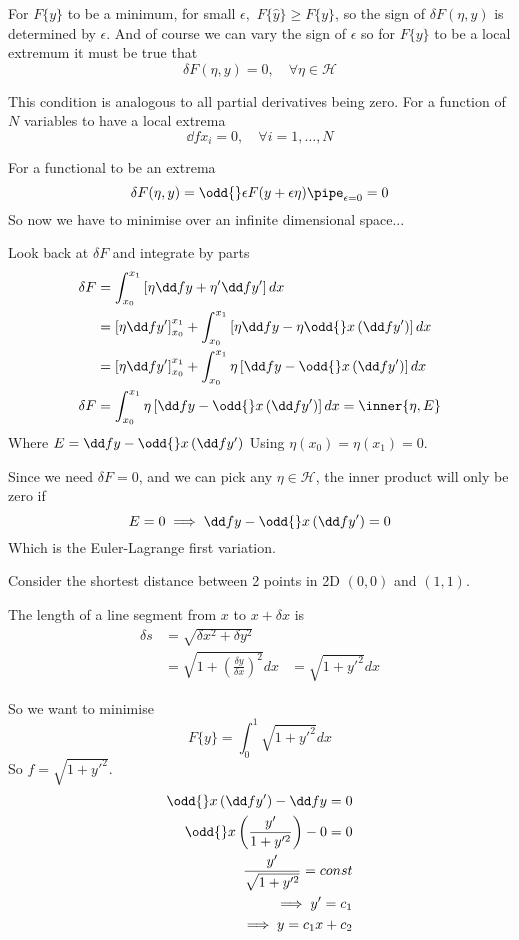 \documentclass{X:/Documents/Coding/Latex/myassignment}
\begin{document}
For $F\{y\}$ to be a minimum, for small $\epsilon,$ $F\{\hat{y}\} \geq F\{y\}$, so the sign of $\delta F(\eta,y)$ is determined by $\epsilon$.
And of course we can vary the sign of $\epsilon$ so for $F\{y\}$ to be a local extremum it must be true that
\[\delta F(\eta,y) = 0, \quad \forall \eta \in \mathcal{H}\]

This condition is analogous to all partial derivatives being zero. For a function of $N$ variables to have a local extrema
\[\dd f{x_i} = 0, \quad \forall i = 1,\ldots,N\]

For a functional to be an extrema 
\[\delta F(\eta,y) = \odd{}\epsilon F(y+\epsilon \eta) \pipe_{\epsilon = 0} = 0\]
So now we have to minimise over an infinite dimensional space...

Look back at $\delta F$ and integrate by parts
\begin{align*}
	\delta F &= \int_{x_0}^{x_1} \left[\eta \dd fy + \eta' \dd f{y'}\right] dx\\
	&= \left[\eta \dd f{y'}\right]_{x_0}^{x_1} + \int_{x_0}^{x_1} \left[\eta \dd fy - \eta \odd{}x \left(\dd f{y'}\right)\right]dx\\
	&= \left[\eta \dd f{y'}\right]_{x_0}^{x_1} + \int_{x_0}^{x_1} \eta\left[ \dd fy - \odd{}x \left(\dd f{y'}\right)\right]dx\\
	\delta F&= \int_{x_0}^{x_1} \eta\left[ \dd fy - \odd{}x \left(\dd f{y'}\right)\right]dx = \inner{\eta,E}\\
\end{align*}
Where $E = \dd fy - \odd{}x \left(\dd f{y'}\right)$
Using $\eta(x_0) = \eta(x_1) = 0$.

Since we need $\delta F = 0$, and we can pick any $\eta \in \mathcal{H}$, the inner product will only be zero if
\[E= 0 \implies \dd fy - \odd{}x \left(\dd f{y'}\right) = 0\]
Which is the Euler-Lagrange first variation.


Consider the shortest distance between 2 points in 2D $(0,0)$ and $(1,1)$.

The length of a line segment from $x$ to $x + \delta x$ is
\begin{align*}
	\delta s &= \sqrt{\delta x^2 + \delta y^2}\\
	&= \sqrt{1 + \left(\frac{\delta y}{\delta x}\right)^2}dx
	&= \sqrt{1 + y'^2}dx
\end{align*}

So we want to minimise
\[F\{y\} = \int_0^1 \sqrt{1+y'^2} dx\]
So $f = \sqrt{1+y'^2}$.
\begin{align*}
	\odd{}x \left(\dd f{y'}\right) - \dd fy = 0\\
	\odd{}x \left(\frac{y'}{1+y'^2}\right) - 0 =0\\
	\frac{y'}{\sqrt{1+y'^2}} = const\\
	\implies y' = c_1\\
	\implies y = c_1 x+ c_2
\end{align*}
\end{document}
